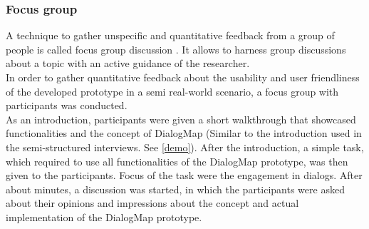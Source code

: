 \subsubsection{Focus group}

A technique to gather unspecific and quantitative feedback from a group of people is called focus group discussion \cite{morgan1996_focus_groups}. It allows to harness group discussions about a topic with an active guidance of the researcher.\\
In order to gather quantitative feedback about the usability and user friendliness of the developed prototype in a semi real-world scenario, a focus group with  participants was conducted.\\
As an introduction, participants were given a short walkthrough that showcased functionalities and the concept of DialogMap (Similar to the introduction used in the semi-structured interviews. See \ref{demo}). After the introduction, a simple task, which required to use all functionalities of the DialogMap prototype, was then given to the participants. Focus of the task were the engagement in dialogs. After about  minutes, a discussion was started, in which the participants were asked about their opinions and impressions about the concept and actual implementation of the DialogMap prototype. 

